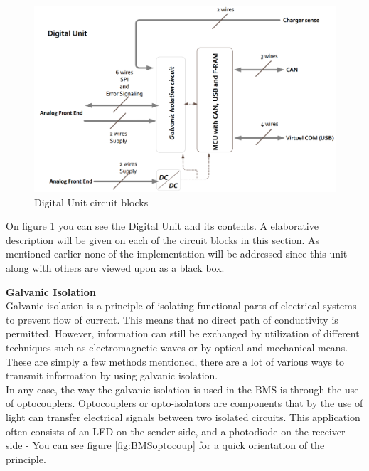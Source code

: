 \begin{figure}[H]
	\centering
	\includegraphics[width=1.0\linewidth]{Hardware/Pictures/BMSdigitalUnit}
	\caption[Empty]{Digital Unit circuit blocks\footnotemark}
	\label{fig:BMSdigitalUnit}
\end{figure}

On figure \ref{fig:BMSdigitalUnit} you can see the Digital Unit and its contents. A elaborative description will be given on each of the circuit blocks in this section. As mentioned earlier none of the implementation will be addressed since this unit along with others are viewed upon as a black box.

\textbf{Galvanic Isolation}\\
Galvanic isolation is a principle of isolating functional parts of electrical systems to prevent flow of current. This means that no direct path of conductivity is permitted. However, information can still be exchanged by utilization of different techniques such as electromagnetic waves or by optical and mechanical means. These are simply a few methods mentioned, there are a lot of various ways to transmit information by using galvanic isolation.\\
In any case, the way the galvanic isolation is used in the BMS is through the use of optocouplers. Optocouplers or opto-isolators are components that by the use of light can transfer electrical signals between two isolated circuits. This application often consists of an LED on the sender side, and a photodiode on the receiver side - You can see figure \ref{fig:BMSoptocoup} for a quick orientation of the principle.

